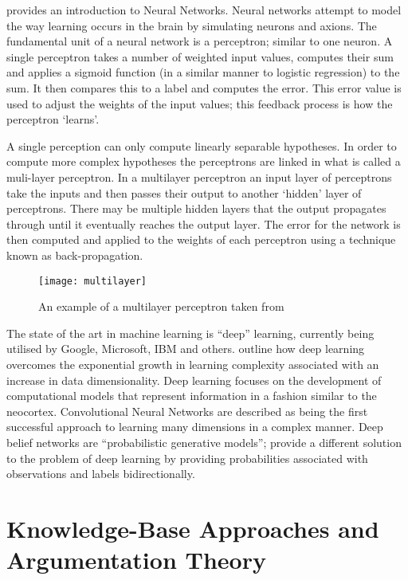 \cite{shiffman2012nature} provides an introduction to Neural Networks. Neural networks attempt to model the way learning occurs in the brain by simulating neurons and axions. The fundamental unit of a neural network is a perceptron; similar to one neuron. A single perceptron takes a number of weighted input values, computes their sum and applies a sigmoid function (in a similar manner to logistic regression) to the sum. It then compares this to a label and computes the error. This error value is used to adjust the weights of the input values; this feedback process is how the perceptron `learns'. 

A single perception can only compute linearly separable hypotheses. In order to compute more complex hypotheses the perceptrons are linked in what is called a muli-layer perceptron. In a multilayer perceptron an input layer of perceptrons take the inputs and then passes their output to another `hidden' layer of perceptrons. There may be multiple hidden layers that the output propagates through until it eventually reaches the output layer. The error for the network is then computed and applied to the weights of each perceptron using a technique known as back-propagation.

\begin{figure}[!h]
\centering
\texttt{[image: multilayer]}
\caption{An example of a multilayer perceptron taken from \cite{shiffman2012nature}}
\label{fig:my_label}
\end{figure}

The state of the art in machine learning is “deep” learning, currently being utilised by Google, Microsoft, IBM and others. \cite{arel2010deep} outline how deep learning overcomes the exponential growth in learning complexity associated with an increase in data dimensionality. Deep learning focuses on the development of computational models that represent information in a fashion similar to the neocortex. Convolutional Neural Networks are described as being the first successful approach to learning many dimensions in a complex manner. Deep belief networks are “probabilistic generative models”; provide a different solution to the problem of deep learning by providing probabilities associated with observations and labels bidirectionally.

\section{Knowledge-Base Approaches and Argumentation Theory}


